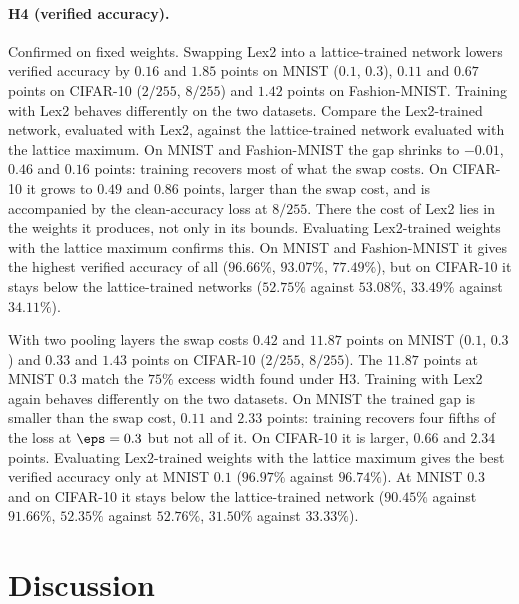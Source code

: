 \paragraph{H4 (verified accuracy).} Confirmed on fixed weights. Swapping Lex2 into a lattice-trained network lowers verified accuracy by $0.16$ and $1.85$ points on MNIST ($0.1$, $0.3$), $0.11$ and $0.67$ points on CIFAR-10 ($2/255$, $8/255$) and $1.42$ points on Fashion-MNIST. Training with Lex2 behaves differently on the two datasets. Compare the Lex2-trained network, evaluated with Lex2, against the lattice-trained network evaluated with the lattice maximum. On MNIST and Fashion-MNIST the gap shrinks to $-0.01$, $0.46$ and $0.16$ points: training recovers most of what the swap costs. On CIFAR-10 it grows to $0.49$ and $0.86$ points, larger than the swap cost, and is accompanied by the clean-accuracy loss at $8/255$. There the cost of Lex2 lies in the weights it produces, not only in its bounds. Evaluating Lex2-trained weights with the lattice maximum confirms this. On MNIST and Fashion-MNIST it gives the highest verified accuracy of all ($96.66\%$, $93.07\%$, $77.49\%$), but on CIFAR-10 it stays below the lattice-trained networks ($52.75\%$ against $53.08\%$, $33.49\%$ against $34.11\%$).

With two pooling layers the swap costs $0.42$ and $11.87$ points on MNIST ($0.1$, $0.3$) and $0.33$ and $1.43$ points on CIFAR-10 ($2/255$, $8/255$). The $11.87$ points at MNIST $0.3$ match the $75\%$ excess width found under H3. Training with Lex2 again behaves differently on the two datasets. On MNIST the trained gap is smaller than the swap cost, $0.11$ and $2.33$ points: training recovers four fifths of the loss at $\eps=0.3$ but not all of it. On CIFAR-10 it is larger, $0.66$ and $2.34$ points. Evaluating Lex2-trained weights with the lattice maximum gives the best verified accuracy only at MNIST $0.1$ ($96.97\%$ against $96.74\%$). At MNIST $0.3$ and on CIFAR-10 it stays below the lattice-trained network ($90.45\%$ against $91.66\%$, $52.35\%$ against $52.76\%$, $31.50\%$ against $33.33\%$).

\section{Discussion}

